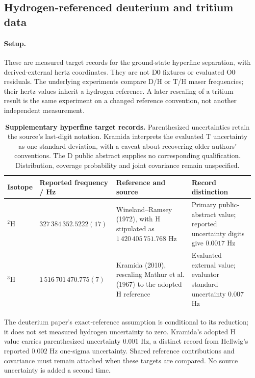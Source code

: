\subsection{Hydrogen-referenced deuterium and tritium data}
\label{manual2:dt-target-data}
\paragraph{Setup.}
These are measured target records for the ground-state hyperfine separation,
with derived-external hertz coordinates. They are not D0 fixtures or evaluated
O0 residuals. The underlying experiments compare D/H or T/H maser frequencies;
their hertz values inherit a hydrogen reference. A later rescaling of a
tritium result is the same experiment on a changed reference convention, not
another independent measurement.

\begin{table}[H]
\centering\small
\caption{\textbf{Supplementary hyperfine target records.} Parenthesized
uncertainties retain the source's last-digit notation. Kramida interprets the
evaluated T uncertainty as one standard deviation, with a caveat about recovering
older authors' conventions. The D public abstract supplies no corresponding
qualification. Distribution, coverage probability and joint covariance remain
unspecified.}
\label{tab:manual2-dt-targets}
\begin{tabularx}{\textwidth}{@{}p{}p{}XX@{}}
\toprule
Isotope & Reported frequency / Hz & Reference and source & Record distinction\\
\midrule
\({}^{2}\mathrm H\) & \(327\,384\,352.5222(17)\) &
Wineland--Ramsey (1972), with H stipulated as
\(1\,420\,405\,751.768\) Hz & Primary public-abstract value;
reported uncertainty digits give \(0.0017\) Hz\\
\({}^{3}\mathrm H\) & \(1\,516\,701\,470.775(7)\) &
Kramida (2010), rescaling Mathur et al. (1967) to the adopted H reference &
Evaluated external value; evaluator standard uncertainty \(0.007\) Hz\\
\bottomrule
\end{tabularx}
\end{table}

The deuterium paper's exact-reference assumption is conditional to its
reduction; it does not set measured hydrogen uncertainty to zero. Kramida's
adopted H value carries parenthesized uncertainty \(0.001\) Hz, a distinct
record from Hellwig's reported \(0.002\) Hz one-sigma uncertainty. Shared
reference contributions and covariance must remain attached when these
targets are compared. No source uncertainty is added a second time.

